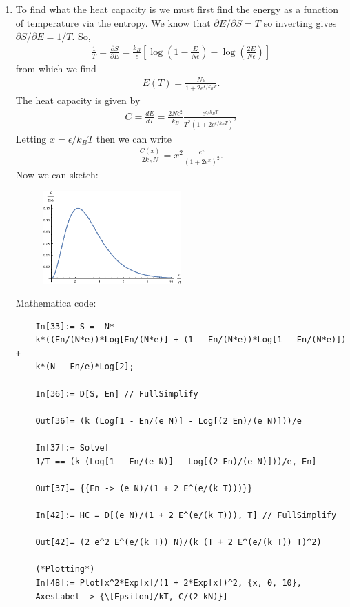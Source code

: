 \documentclass{article}
\theoremstyle{definition}
\newcommand{\p}{\partial}
\newcommand{\f}[2]{\frac{#1}{#2}}
\newcommand{\lp}{\left(}
\newcommand{\rp}{\right)}
\newcommand{\lb}{\left[}
\newcommand{\rb}{\right]}
\begin{document}
\begin{enumerate}[label=(\alph*)]
	\item To find what the heat capacity is we must first find the energy as a function of temperature via the entropy. We know that $\p E/ \p S = T$ so inverting gives $\p S/\p E = 1/T$. So, 
	\begin{align*}
	\f{1}{T} = \f{\p S}{\p E} = \f{k_B}{\epsilon}\lb \log \lp 1  - \f{E}{N\epsilon}  \rp - \log \lp \f{2 E}{N\epsilon} \rp  \rb
	\end{align*}
	from which we find 
	\begin{align*}
	E(T) = \f{N\epsilon}{1 + 2e^{\epsilon/k_BT}}.
	\end{align*}
	The heat capacity is given by 
	\begin{align*}
	C = \f{dE}{dT} = \boxed{\f{2N\epsilon^2}{k_B}\f{e^{\epsilon/k_BT}}{T^2\lp 1 +  2 e^{\epsilon/k_BT} \rp^2}}
	\end{align*}
	Letting $x = \epsilon/k_BT$ then we can write
	\begin{align*}
	\f{C(x)}{2k_BN} = x^2\f{e^x}{(1+2e^x)^2}.
	\end{align*}
	Now we can sketch:
	\begin{figure}[!htb]
		\centering
		\includegraphics[width=0.5\textwidth]{problem3.eps}
	\end{figure}
	Mathematica code:
	\begin{lstlisting}
	In[33]:= S = -N*
	k*((En/(N*e))*Log[En/(N*e)] + (1 - En/(N*e))*Log[1 - En/(N*e)]) + 
	k*(N - En/e)*Log[2];
	
	In[36]:= D[S, En] // FullSimplify
	
	Out[36]= (k (Log[1 - En/(e N)] - Log[(2 En)/(e N)]))/e
	
	In[37]:= Solve[
	1/T == (k (Log[1 - En/(e N)] - Log[(2 En)/(e N)]))/e, En]
	
	Out[37]= {{En -> (e N)/(1 + 2 E^(e/(k T)))}}
	
	In[42]:= HC = D[(e N)/(1 + 2 E^(e/(k T))), T] // FullSimplify
	
	Out[42]= (2 e^2 E^(e/(k T)) N)/(k (T + 2 E^(e/(k T)) T)^2)
	
	(*Plotting*)
	In[48]:= Plot[x^2*Exp[x]/(1 + 2*Exp[x])^2, {x, 0, 10}, 
	AxesLabel -> {\[Epsilon]/kT, C/(2 kN)}]
	\end{lstlisting}
	

\end{enumerate}
\end{document}
